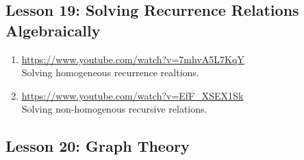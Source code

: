 \documentclass[11pt]{amsart}
\begin{document}
\subsection{Lesson 19: Solving Recurrence Relations Algebraically}

\begin{enumerate}

\item \url{https://www.youtube.com/watch?v=7mhvA5L7KqY}\\
Solving homogeneous recurrence realtions.\\[5pt]

\item \url{https://www.youtube.com/watch?v=EfF_XSEX1Sk}\\
Solving non-homogenous recursive relations.\\[5pt]


\end{enumerate}

\subsection{Lesson 20: Graph Theory}
\end{document}
